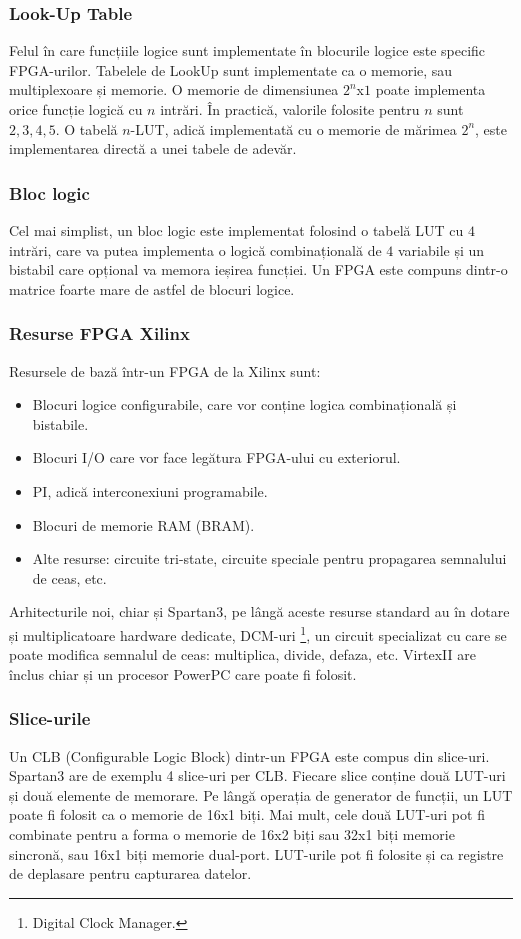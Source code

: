 \documentclass[12pt,twoside,a4paper,fleqn]{book}
\begin{document}
\subsubsection{Look-Up Table}
Felul în care funcțiile logice sunt implementate în blocurile logice este specific FPGA-urilor. Tabelele de LookUp sunt implementate ca o memorie, sau multiplexoare și memorie. O memorie de dimensiunea $2^{n}$x$1$ poate implementa orice funcție logică cu $n$ intrări. În practică, valorile folosite pentru $n$ sunt $2,3,4,5$. O tabelă $n$-LUT, adică implementată cu o memorie de mărimea $2^{n}$, este implementarea directă a unei tabele de adevăr.
\subsubsection{Bloc logic}
Cel mai simplist, un bloc logic este implementat folosind o tabelă LUT cu $4$ intrări, care va putea implementa o logică combinațională de $4$ variabile și un bistabil care opțional va memora ieșirea funcției. Un FPGA este compuns dintr-o matrice foarte mare de astfel de blocuri logice.
\subsubsection{Resurse FPGA Xilinx}
Resursele de bază într-un FPGA de la Xilinx sunt:
\begin{itemize}
\item Blocuri logice configurabile, care vor conține logica combinațională și bistabile.
\item Blocuri I/O care vor face legătura FPGA-ului cu exteriorul.
\item PI, adică interconexiuni programabile.
\item Blocuri de memorie RAM (BRAM).
\item Alte resurse: circuite tri-state, circuite speciale pentru propagarea semnalului de ceas, etc.
\end{itemize}

Arhitecturile noi, chiar și Spartan3, pe lângă aceste resurse standard au în dotare și multiplicatoare hardware dedicate, DCM-uri \footnote{Digital Clock Manager.}, un circuit specializat cu care se poate modifica semnalul de ceas: multiplica, divide, defaza, etc. VirtexII are înclus chiar și un procesor PowerPC care poate fi folosit.

\subsubsection{Slice-urile}
Un CLB (Configurable Logic Block) dintr-un FPGA este compus din slice-uri. Spartan3 are de exemplu 4 slice-uri per CLB. Fiecare slice conține două LUT-uri și două elemente de memorare. Pe lângă operația de generator de funcții, un LUT poate fi folosit ca o memorie de 16x1 biți. Mai mult, cele două LUT-uri pot fi combinate pentru a forma o memorie de 16x2 biți sau 32x1 biți memorie sincronă, sau 16x1 biți memorie dual-port. LUT-urile pot fi folosite și ca registre de deplasare pentru capturarea datelor.
\end{document}
